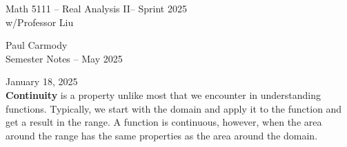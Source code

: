 \documentclass[10pt,a4paper]{report}
\newcommand{\CLASSNAME}{Math 5111 -- Real Analysis II}
\newcommand{\STUDENTNAME}{Paul Carmody}
\newcommand{\ASSIGNMENT}{Semester Notes }
\newcommand{\DUEDATE}{May 2025}
\newcommand{\SEMESTER}{Sprint 2025}
\begin{document}
\begin{center}
	\Large{\CLASSNAME -- \SEMESTER} \\
	\large{ w/Professor Liu}
\end{center}
\begin{center}
	\STUDENTNAME \\
	\ASSIGNMENT -- \DUEDATE\\
\end{center} 

\noindent January 18, 2025\\

\noindent \textbf{Continuity} is a property unlike most that we encounter in understanding functions.  Typically, we start with the domain and apply it to the function and get a result in the range.  A function is continuous, however, when the area around the range has the same properties as the area around the domain.
\end{document}
